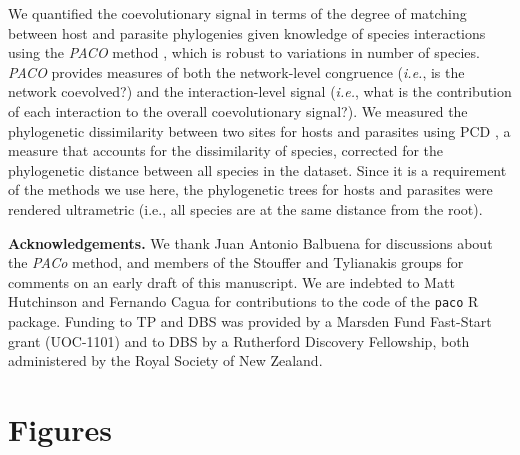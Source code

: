 We quantified the coevolutionary signal in terms of the degree of
matching between host and parasite phylogenies given knowledge of
species interactions using the \emph{PACO} method \citep{balb13}, which
is robust to variations in number of species. \emph{PACO} provides
measures of both the network-level congruence (\emph{i.e.}, is the
network coevolved?) and the interaction-level signal (\emph{i.e.}, what
is the contribution of each interaction to the overall coevolutionary
signal?). We measured the phylogenetic dissimilarity between two sites
for hosts and parasites using PCD \citep{ives10}, a measure that
accounts for the dissimilarity of species, corrected for the
phylogenetic distance between all species in the dataset. Since it is a
requirement of the methods we use here, the phylogenetic trees for hosts
and parasites were rendered ultrametric (i.e., all species are at the
same distance from the root).

\textbf{Acknowledgements.} We thank Juan Antonio Balbuena for
discussions about the \emph{PACo} method, and members of the Stouffer
and Tylianakis groups for comments on an early draft of this manuscript.
We are indebted to Matt Hutchinson and Fernando Cagua for contributions
to the code of the \texttt{paco} R package. Funding to TP and DBS was
provided by a Marsden Fund Fast-Start grant (UOC-1101) and to DBS by a
Rutherford Discovery Fellowship, both administered by the Royal Society
of New Zealand.

\clearpage

\section{Figures}\label{figures}

